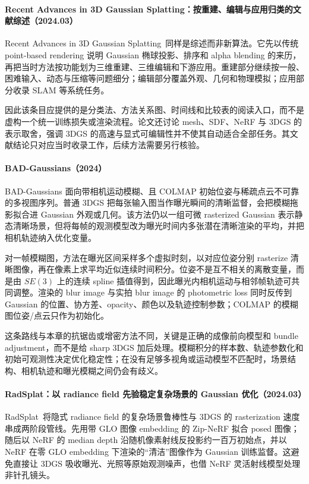 \paragraph{Recent Advances in 3D Gaussian Splatting：按重建、编辑与应用归类的文献综述（2024.03）}
Recent Advances in 3D Gaussian Splatting~\cite{2403_11134}同样是综述而非新算法。它先以传统 point-based rendering 说明 Gaussian 椭球投影、排序和 alpha blending 的来历，再把当时方法按功能划为三维重建、三维编辑和下游应用。重建部分继续按一般、困难输入、动态与压缩等问题细分；编辑部分覆盖外观、几何和物理模拟；应用部分收录 SLAM 等系统任务。

因此该条目应提供的是分类法、方法关系图、时间线和比较表的阅读入口，而不是虚构一个统一训练损失或渲染流程。论文还讨论 mesh、SDF、NeRF 与 3DGS 的表示取舍，强调 3DGS 的高速与显式可编辑性并不使其自动适合全部任务。其文献结论只对应当时收录工作，后续方法需要另行核验。


\paragraph{BAD-Gaussians（2024）\cite{2403_11831}}
BAD-Gaussians 面向带相机运动模糊、且 COLMAP 初始位姿与稀疏点云不可靠的多视图序列。普通 3DGS 把每张输入图当作曝光瞬间的清晰监督，会把模糊拖影拟合进 Gaussian 外观或几何。该方法仍以一组可微 rasterized Gaussian 表示静态清晰场景，但将每帧的观测模型改为曝光时间内多张潜在清晰渲染的平均，并把相机轨迹纳入优化变量。

对一帧模糊图，方法在曝光区间采样多个虚拟时刻，以对应位姿分别 rasterize 清晰图像，再在像素上求平均近似连续时间积分。位姿不是互不相关的离散变量，而是由 $SE(3)$ 上的连续 spline 插值得到，因此曝光内相机运动与相邻帧轨迹可共同调整。渲染的 blur image 与实拍 blur image 的 photometric loss 同时反传到 Gaussian 的位置、协方差、opacity、颜色以及轨迹控制参数；COLMAP 的模糊图位姿/点云只作为初始化。

这条路线与本章的抗锯齿或增密方法不同，关键是正确的成像前向模型和 bundle adjustment，而不是给 sharp 3DGS 加后处理。模糊积分的样本数、轨迹参数化和初始可观测性决定优化稳定性；在没有足够多视角或运动模型不匹配时，场景结构、相机轨迹和曝光模糊之间仍会有歧义。

\paragraph{RadSplat：以 radiance field 先验稳定复杂场景的 Gaussian 优化（2024.03）}
RadSplat~\cite{2403_13806}将隐式 radiance field 的复杂场景鲁棒性与 3DGS 的 rasterization 速度串成两阶段管线。先用带 GLO 图像 embedding 的 Zip-NeRF 拟合 posed 图像；随后以 NeRF 的 median depth 沿随机像素射线反投影约一百万初始点，并以 NeRF 在零 GLO embedding 下渲染的“清洁”图像作为 Gaussian 训练监督。这避免直接让 3DGS 吸收曝光、光照等原始观测噪声，也借 NeRF 灵活射线模型处理非针孔镜头。

